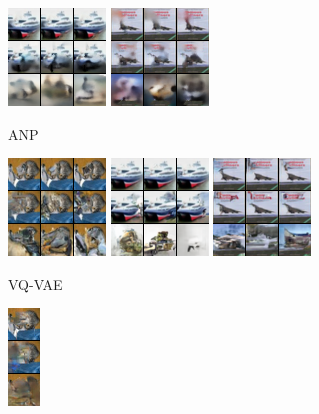 \begin{figure}[t]
\begin{subfigure}[t]{0.17\textwidth}
      \includegraphics[height=\cifarimgheight]{figs/cigcvae/image-samples/cifar10/freeform_anp_1_samples}
      \includegraphics[height=\cifarimgheight]{figs/cigcvae/image-samples/cifar10/freeform_anp_3_samples}
      \caption{\scriptsize ANP}
    \end{subfigure}
    \begin{subfigure}[t]{0.17\textwidth}
      \centering
      \includegraphics[height=\cifarimgheight]{figs/cigcvae/image-samples/cifar10/freeform_vq_vae_0_samples}
      \includegraphics[height=\cifarimgheight]{figs/cigcvae/image-samples/cifar10/freeform_vq_vae_1_samples}
      \includegraphics[height=\cifarimgheight]{figs/cigcvae/image-samples/cifar10/freeform_vq_vae_3_samples}
      \caption{\scriptsize VQ-VAE}
    \end{subfigure}
    \begin{subfigure}[t]{0.06\textwidth}
      \centering
      \includegraphics[height=\cifarimgheight]{figs/cigcvae/image-samples/cifar10/freeform_ce_0_samples}

\end{subfigure}
\end{figure}
